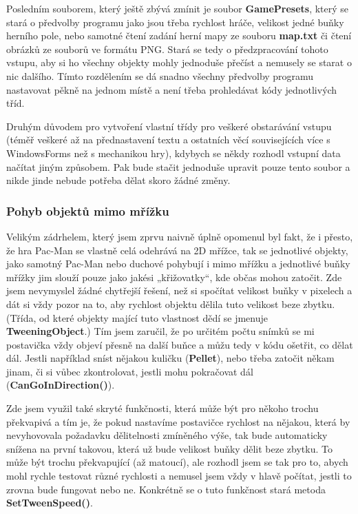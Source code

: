 \documentclass[a4]{article}
\begin{document}
Posledním souborem, který ještě zbývá zmínit je soubor \textbf{GamePresets}, který se stará o předvolby programu jako jsou třeba rychlost hráče, velikost jedné buňky herního pole, nebo samotné čtení zadání herní mapy ze souboru \textbf{map.txt} či čtení obrázků ze souborů ve formátu PNG. Stará se tedy o předzpracování tohoto vstupu, aby si ho všechny objekty mohly jednoduše přečíst a nemusely se starat o nic dalšího. Tímto rozdělením se dá snadno všechny předvolby programu nastavovat pěkně na jednom místě a není třeba prohledávat kódy jednotlivých tříd.

Druhým důvodem pro vytvoření vlastní třídy pro veškeré obstarávání vstupu (téměř veškeré až na přednastavení textu a ostatních věcí souvisejících více s WindowsForms než s mechanikou hry), kdybych se někdy rozhodl vstupní data načítat jiným způsobem. Pak bude stačit jednoduše upravit pouze tento soubor a nikde jinde nebude potřeba dělat skoro žádné změny.
\subsubsection{Pohyb objektů mimo mřížku} \label{tweening}
Velikým zádrhelem, který jsem zprvu naivně úplně opomenul byl fakt, že i přesto, že hra Pac-Man se vlastně celá odehrává na 2D mřížce, tak se jednotlivé objekty, jako samotný Pac-Man nebo duchové pohybují i mimo mřížku a jednotlivé buňky mřížky jim slouží pouze jako jakési „křižovatky“, kde občas mohou zatočit. Zde jsem nevymyslel žádné chytřejší řešení, než si spočítat velikost buňky v pixelech a dát si vždy pozor na to, aby rychlost objektu dělila tuto velikost beze zbytku. (Třída, od které objekty mající tuto vlastnost dědí se jmenuje \textbf{TweeningObject}.) Tím jsem zaručil, že po určitém počtu snímků se mi postavička vždy objeví přesně na další buňce a můžu tedy v kódu ošetřit, co dělat dál. Jestli například sníst nějakou kuličku (\textbf{Pellet}), nebo třeba zatočit někam jinam, či si vůbec zkontrolovat, jestli mohu pokračovat dál (\textbf{CanGoInDirection()}).

Zde jsem využil také skryté funkčnosti, která může být pro někoho trochu překvapivá a tím je, že pokud nastavíme postavičce rychlost na nějakou, která by nevyhovovala požadavku dělitelnosti zmíněného výše, tak bude automaticky snížena na první takovou, která už bude velikost buňky dělit beze zbytku. To může být trochu překvapující (až matoucí), ale rozhodl jsem se tak pro to, abych mohl rychle testovat různé rychlosti a nemusel jsem vždy v hlavě počítat, jestli to zrovna bude fungovat nebo ne. Konkrétně se o tuto funkčnost stará metoda \textbf{SetTweenSpeed()}. 
\end{document}
